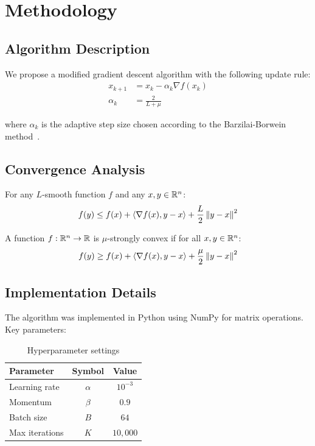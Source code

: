 \section{Methodology}
\label{sec:methods}

\subsection{Algorithm Description}
We propose a modified gradient descent algorithm with the following update rule:
\begin{align}
    x_{k+1} &= x_k - \alpha_k \nabla f(x_k) \label{eq:update} \\
    \alpha_k &= \frac{2}{L + \mu} \label{eq:stepsize}
\end{align}

where $\alpha_k$ is the adaptive step size chosen according to the
Barzilai-Borwein method~\cite{barzilai1988}.

\subsection{Convergence Analysis}
\begin{lemma}
\label{lem:descent}
For any $L$-smooth function $f$ and any $x, y \in \mathbb{R}^n$:
\[
    f(y) \leq f(x) + \langle \nabla f(x), y - x \rangle + \frac{L}{2} \left\| y - x \right\|^2
\]
\end{lemma}

\begin{definition}
A function $f: \mathbb{R}^n \to \mathbb{R}$ is $\mu$-strongly convex if for all $x, y \in \mathbb{R}^n$:
\[
    f(y) \geq f(x) + \langle \nabla f(x), y - x \rangle + \frac{\mu}{2} \left\| y - x \right\|^2
\]
\end{definition}

\subsection{Implementation Details}
The algorithm was implemented in Python using NumPy for matrix operations.
Key parameters:
\begin{table}[h]
\centering
\begin{tabular}{lcc}
\hline
\textbf{Parameter} & \textbf{Symbol} & \textbf{Value} \\
\hline
Learning rate    & $\alpha$ & $10^{-3}$   \\
Momentum         & $\beta$  & $0.9$       \\
Batch size       & $B$      & $64$        \\
Max iterations   & $K$      & $10{,}000$  \\
\hline
\end{tabular}
\caption{Hyperparameter settings}
\label{tab:params}
\end{table}
